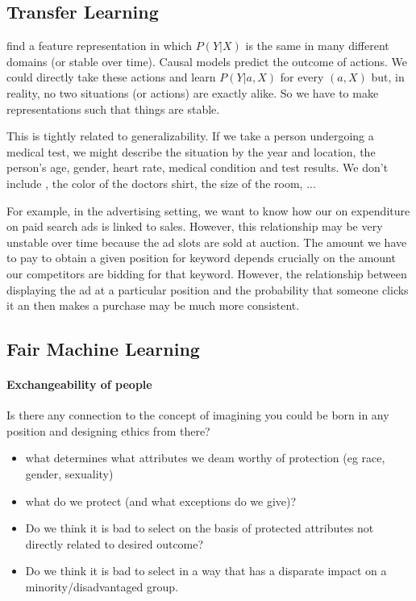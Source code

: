 \documentclass[11pt,a4paper,oneside]{book}
\begin{document}
\subsection*{Transfer Learning}
find a feature representation in which $P(Y|X)$ is the same in many different domains (or stable over time). Causal models predict the outcome of actions. We could directly take these actions and learn $P(Y|a,X)$ for every $(a,X)$ but, in reality, no two situations (or actions) are exactly alike. So we have to make representations such that things are stable. 

This is tightly related to generalizability. If we take a person undergoing a medical test, we might describe the situation by the year and location, the person's age, gender, heart rate, medical condition and test results. We don't include , the color of the doctors shirt, the size of the room, ...

For example, in the advertising setting, we want to know how our on expenditure on paid search ads is linked to sales. However, this relationship may be very unstable over time because the ad slots are sold at auction. The amount we have to pay to obtain a given position for keyword depends crucially on the amount our competitors are bidding for that keyword. However, the relationship between displaying the ad at a particular position and the probability that someone clicks it an then makes a purchase may be much more consistent. 

\subsection*{Fair Machine Learning}
\paragraph*{Exchangeability of people} Is there any connection to the concept of imagining you could be born in any position and designing ethics from there?
\begin{itemize}
\item what determines what attributes we deam worthy of protection (eg race, gender, sexuality)
\item what do we protect (and what exceptions do we give)?
\item Do we think it is bad to select on the basis of protected attributes not directly related to desired outcome?
\item Do we think it is bad to select in a way that has a disparate impact on a minority/disadvantaged group.
\end{itemize}
\end{document}

